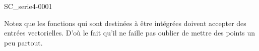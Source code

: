 \begin{corrige}{SC_serie4-0001}



Notez que les fonctions qui sont destinées à être intégrées doivent accepter des entrées vectorielles. D'où le fait qu'il ne faille pas oublier de mettre des points un peu partout.

\end{corrige}
